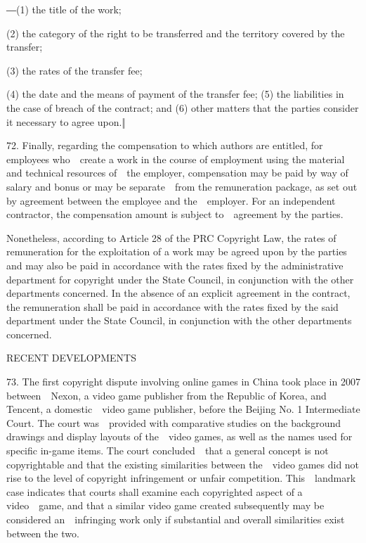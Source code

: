 \documentclass[
]{article}
\begin{document}
{―(1) the title of the work;}

{(2) the category of the right to be transferred and the territory
covered by the transfer;}

{(3) the rates of the transfer fee;}

{(4) the date and the means of payment of the transfer fee; (5) the
liabilities in the case of breach of the contract; and }{(6) other
matters that the parties consider it necessary to agree upon.‖}

{72. }{Finally, regarding the compensation to which authors are
entitled, for employees who~~create a work in the course of employment
using the material and technical resources of~~the employer,
compensation may be paid by way of salary and bonus or may be
separate~~from the remuneration package, as set out by agreement between
the employee and the~~employer. For an independent contractor, the
compensation amount is subject to~~agreement by the parties.}

{Nonetheless, according to Article 28 of the PRC }{Copyright Law}{, the
rates of remuneration for the exploitation of a work may be agreed upon
by the parties and may also be paid in accordance with the rates fixed
by the administrative department for copyright under the State Council,
in conjunction with the other departments concerned. In the absence of
an explicit agreement in the contract, the remuneration shall be paid in
accordance with the rates fixed by the said department under the State
Council, in conjunction with the other departments concerned.}

{RECENT DEVELOPMENTS}

{73. }{The first copyright dispute involving online games in China took
place in 2007 between~~Nexon, a video game publisher from the Republic
of Korea, and Tencent, a domestic~~video game publisher, before the
Beijing No. 1 Intermediate Court. The court was~~provided with
comparative studies on the background drawings and display layouts of
the~~video games, as well as the names used for specific in-game items.
The court concluded~~that a general concept is not copyrightable and
that the existing similarities between the~~video games did not rise to
the level of copyright infringement or unfair competition.
This~~landmark case indicates that courts shall examine each copyrighted
aspect of a video~~game, and that a similar video game created
subsequently may be considered an~~infringing work only if substantial
and overall similarities exist between the two.}
\end{document}
